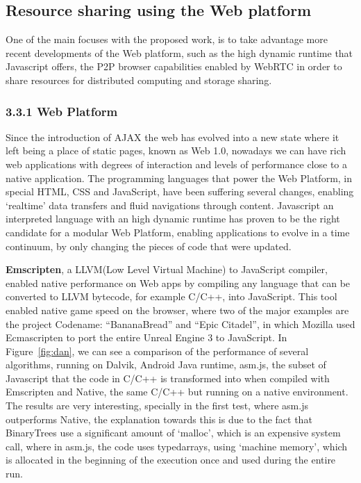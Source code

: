 % 
% 
\subsection{Resource sharing using the Web platform} 

One of the main focuses with the proposed work, is to take advantage more recent developments of the Web platform, such as the high dynamic runtime that Javascript offers, the P2P browser capabilities enabled by WebRTC\cite{Google} in order to share resources for distributed computing and storage sharing. 

\subsubsection{3.3.1 Web Platform}

Since the introduction of AJAX\cite{Google/Mozzila/Opera} the web has evolved into a new state where it left being a place of static pages, known as Web 1.0, nowadays we can have rich web applications with degrees of interaction and levels of performance close to a native application. The programming languages that power the Web Platform, in special HTML, CSS and JavaScript\cite{Ecma2009}, have been suffering several changes, enabling `realtime' data transfers and fluid navigations through content. Javascript an interpreted language with an  high dynamic runtime has proven to be the right candidate for a modular Web Platform, enabling applications to evolve in a time continuum, by only changing the pieces of code that were updated.

\textbf{Emscripten}\cite{Zakai2011}, a LLVM(Low Level Virtual Machine) to JavaScript compiler, enabled native performance on Web apps by compiling any language that can be converted to LLVM bytecode, for example C/C++, into JavaScript. This tool enabled native game speed on the browser, where two of the major examples are the project Codename: ``BananaBread''\cite{Mozilla2012} and ``Epic Citadel''\cite{Mozilla2013}, in which Mozilla used Ecmascripten to port the entire Unreal Engine 3 to JavaScript. In Figure~\ref{fig:dan}, we can see a comparison of the performance of several algorithms, running on Dalvik, Android Java runtime, asm.js, the subset of Javascript that the code in C/C++ is transformed into when compiled with Emscripten and Native, the same C/C++ but running on a native environment. The results are very interesting, specially in the first test, where asm.js outperforms Native, the explanation towards this is due to the fact that BinaryTrees use a significant amount of `malloc', which is an expensive system call, where in asm.js, the code uses typedarrays, using `machine memory', which is allocated in the beginning of the execution once and used during the entire run.

